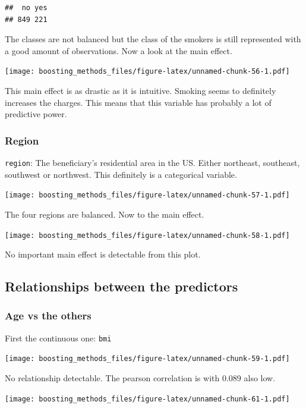 \documentclass[
]{book}
\begin{document}
\begin{verbatim}
##  no yes 
## 849 221
\end{verbatim}

The classes are not balanced but the class of the smokers is still represented with a good amount of observations. Now a look at the main effect.

\texttt{[image: boosting\_methods\_files/figure-latex/unnamed-chunk-56-1.pdf]}

This main effect is as drastic as it is intuitive. Smoking seems to definitely increases the charges. This means that this variable has probably a lot of predictive power.

\hypertarget{region}{%
\subsubsection{Region}\label{region}}

\texttt{region}: The beneficiary's residential area in the US. Either northeast, southeast, southwest or northwest. This definitely is a categorical variable.

\texttt{[image: boosting\_methods\_files/figure-latex/unnamed-chunk-57-1.pdf]}

The four regions are balanced. Now to the main effect.

\texttt{[image: boosting\_methods\_files/figure-latex/unnamed-chunk-58-1.pdf]}

No important main effect is detectable from this plot.

\hypertarget{relationships-between-the-predictors-1}{%
\subsection{Relationships between the predictors}\label{relationships-between-the-predictors-1}}

\hypertarget{age-vs-the-others}{%
\subsubsection{Age vs the others}\label{age-vs-the-others}}

First the continuous one: \texttt{bmi}

\texttt{[image: boosting\_methods\_files/figure-latex/unnamed-chunk-59-1.pdf]}

No relationship detectable. The pearson correlation is with 0.089 also low.

\texttt{[image: boosting\_methods\_files/figure-latex/unnamed-chunk-61-1.pdf]}
\end{document}
